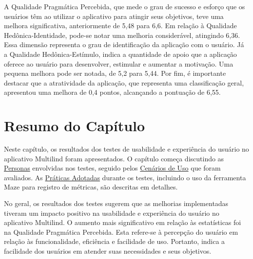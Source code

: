 A Qualidade Pragmática Percebida, que mede o grau de sucesso e esforço que os usuários têm ao utilizar o aplicativo para atingir seus objetivos, teve uma melhora significativa, anteriormente de 5,48 para 6,6. Em relação à 
Qualidade Hedônica-Identidade, pode-se notar uma melhoria considerável, atingindo 6,36. Essa dimensão representa o grau de identificação da aplicação com o usuário. Já a Qualidade Hedônica-Estímulo, indica a quantidade de apoio que a aplicação oferece ao usuário 
para desenvolver, estimular e aumentar a motivação. Uma pequena melhora pode ser notada, de 5,2 para 5,44. Por fim, é importante destacar que a atratividade da aplicação, que representa uma classificação geral, apresentou uma melhora de 0,4 pontos, alcançando a 
pontuação de 6,55.

\section{Resumo do Capítulo}
\label{sec:Resumo do Capítulo 3}
Neste capítulo, os resultados dos testes de usabilidade e experiência do usuário no aplicativo Multilind foram apresentados. O capítulo começa discutindo as \hyperref[sec:Personas]{Personas} envolvidas nos testes, seguido pelos \hyperref[sec:Cenários de Uso]{Cenários de Uso} que foram avaliados. 
As \hyperref[sec:Práticas Adotadas]{Práticas Adotadas} durante os testes, incluindo o uso da ferramenta Maze para registro de métricas, são descritas em detalhes.

No geral, os resultados dos testes sugerem que as melhorias implementadas tiveram um impacto positivo na usabilidade e experiência do usuário no aplicativo Multilind. O aumento mais significativo em relação às estatísticas foi na Qualidade Pragmática Percebida. Esta refere-se à percepção 
do usuário em relação às funcionalidade, eficiência e facilidade de uso. Portanto, indica a facilidade dos usuários em atender suas necessidades e seus objetivos.